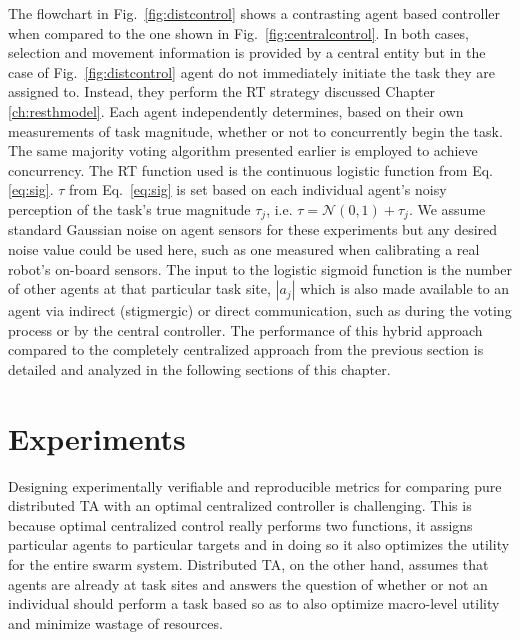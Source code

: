 \documentclass[defaultstyle,12pt]{thesis}
\begin{document}
The flowchart in Fig.~\ref{fig:distcontrol} shows a contrasting agent based controller when compared to the one shown in Fig.~\ref{fig:centralcontrol}. In both cases, selection and movement information is provided by a central entity but in the case of Fig.~\ref{fig:distcontrol} agent do not immediately initiate the task they are assigned to. Instead, they perform the RT strategy discussed Chapter \ref{ch:resthmodel}. Each agent independently determines, based on their own measurements of task magnitude, whether or not to concurrently begin the task. The same majority voting algorithm presented earlier is employed to achieve concurrency. The RT function used is the continuous logistic function from Eq.\ref{eq:sig}. $\tau$ from Eq.~\ref{eq:sig} is set based on each individual agent's noisy perception of the task's true magnitude $\tau_j$, i.e. $\tau = \mathcal{N}(0,1) + \tau_j$. We assume standard Gaussian noise on agent sensors for these experiments but any desired noise value could be used here, such as one measured when calibrating  a real robot's on-board sensors. The input to the logistic sigmoid function is the number of other agents at that particular task site, $|a_j|$ which is also made available to an agent via indirect (stigmergic) or direct communication, such as during the voting process or by the central controller. The performance of this hybrid approach compared to the completely centralized approach from the previous section is detailed and analyzed in the following sections of this chapter.

\section{Experiments}
Designing experimentally verifiable and reproducible metrics for comparing pure distributed TA with an optimal centralized controller is challenging. This is because optimal centralized control really performs two functions, it assigns particular agents to particular targets and in doing so it also optimizes the utility for the entire swarm system. Distributed TA, on the other hand, assumes that agents are already at task sites and answers the question of whether or not an individual should perform a task based so as to also optimize macro-level utility and minimize wastage of resources.
\end{document}

